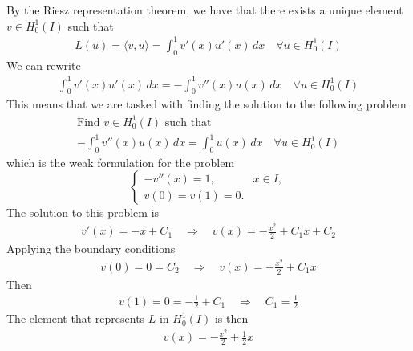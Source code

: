 By the Riesz representation theorem, we have that there exists a unique element \(v \in H^1_0(I)\) such that
\[
    \begin{split}
        L(u) = \langle v, u \rangle = \int_0^1 v'(x) u'(x) \, dx \quad \forall u \in H^1_0(I)
    \end{split}
\]
We can rewrite
\[
    \begin{split}
        \int_0^1 v'(x) u'(x) \, dx = -\int_0^1 v''(x) u(x) \, dx \quad \forall u \in H^1_0(I)
    \end{split}
\]
This means that we are tasked with finding the solution to the following problem
\[
    \begin{split}
        \text{Find } v \in H^1_0(I) \text{ such that } \\
        -\int_0^1 v''(x) u(x) \, dx = \int_0^1 u(x) \, dx \quad \forall u \in H^1_0(I)
    \end{split}
\]
which is the weak formulation for the problem
\[
    \begin{cases}
        -v''(x) = 1, & x \in I, \\
        v(0) = v(1) = 0.
    \end{cases}
\]
The solution to this problem is
\[
    \begin{split}
        v'(x) = -x + C_1 \quad \Rightarrow \quad v(x) = -\frac{x^2}{2} + C_1 x + C_2
    \end{split}
\]
Applying the boundary conditions
\[
    \begin{split}
        v(0) = 0 = C_2 \quad \Rightarrow \quad v(x) = -\frac{x^2}{2} + C_1 x
    \end{split}
\]
Then 
\[
    \begin{split}
        v(1) = 0 = -\frac{1}{2} + C_1 \quad \Rightarrow \quad C_1 = \frac{1}{2}
    \end{split}
\]
The element that represents \(L\) in \(H^1_0(I)\) is then
\[
    \begin{split}
        v(x) = -\frac{x^2}{2} + \frac{1}{2} x
    \end{split}
\]
